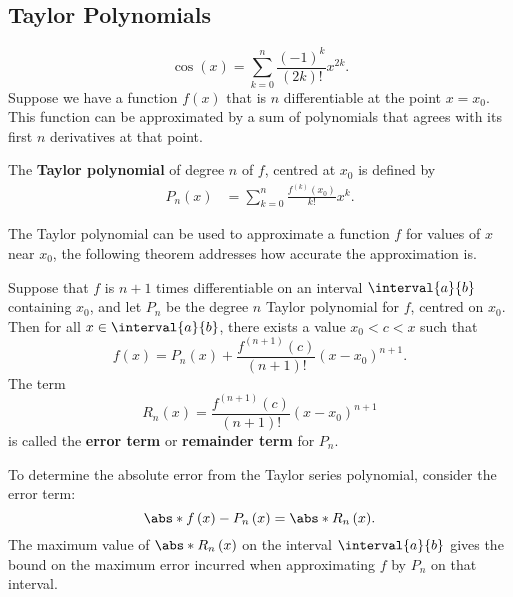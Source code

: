 \documentclass{article}
\begin{document}
\subsection{Taylor Polynomials}
\begin{equation*}
    \cos{\left( x \right)} = \sum_{k = 0}^n \frac{\left( -1 \right)^k}{\left(2k \right)!} x^{2k}.
\end{equation*}
Suppose we have a function \(f\left( x \right)\) that is \(n\) differentiable at the point
\(x = x_0\). This function can be approximated by a sum of polynomials that agrees with its first \(n\) derivatives at that point.
\begin{definition}
    The \textbf{Taylor polynomial} of degree \(n\) of \(f\), centred at \(x_0\) is defined by
    \begin{align*}
        P_n\left( x \right) & = \sum_{k = 0}^n \frac{f^{\left( k \right)}\left( x_0 \right)}{k!} x^k.
    \end{align*}
\end{definition}
The Taylor polynomial can be used to approximate a function \(f\) for values of \(x\) near \(x_0\), the following
theorem addresses how accurate the approximation is.
\begin{definition}
    Suppose that \(f\) is \(n + 1\) times differentiable on an interval \(\interval{a}{b}\) containing \(x_0\),
    and let \(P_n\) be the degree \(n\) Taylor polynomial for \(f\), centred on \(x_0\). Then for all \(x \in \interval{a}{b}\),
    there exists a value \(x_0 < c < x\) such that
    \begin{equation*}
        f\left( x \right) = P_n\left( x \right) + \frac{f^{\left( n + 1 \right)}\left( c \right)}{\left( n + 1 \right)!} \left( x - x_0 \right)^{n + 1}.
    \end{equation*}
    The term
    \begin{equation*}
        R_n\left( x \right) = \frac{f^{\left( n + 1 \right)}\left( c \right)}{\left( n + 1 \right)!} \left( x - x_0 \right)^{n + 1}
    \end{equation*}
    is called the \textbf{error term} or \textbf{remainder term} for \(P_n\).
\end{definition}
To determine the absolute error from the Taylor series polynomial, consider the error term:
\begin{equation*}
    \abs*{f\left( x \right) - P_n\left( x \right)} = \abs*{R_n\left( x \right)}.
\end{equation*}
The maximum value of \(\abs*{R_n\left( x \right)}\) on the interval \(\interval{a}{b}\) gives the bound on the maximum error incurred when approximating
\(f\) by \(P_n\) on that interval.
\end{document}
